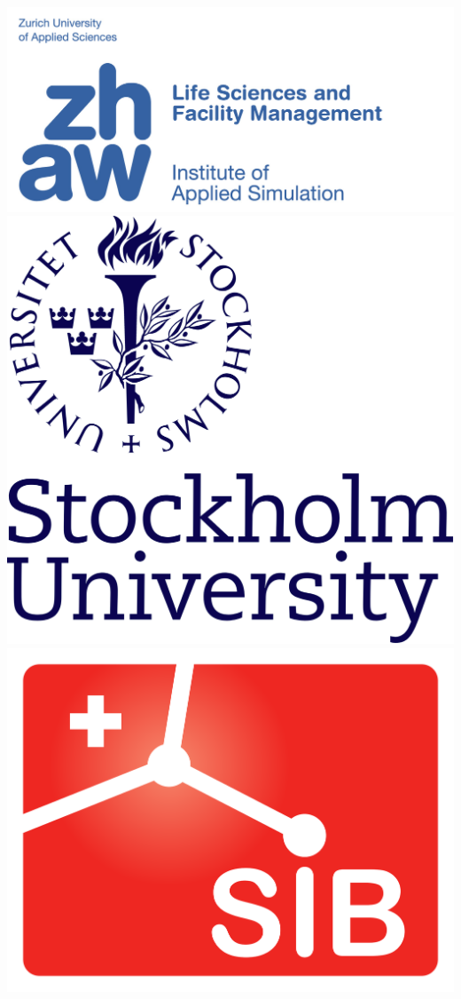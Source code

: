 \documentclass[widescreen,fleqn]{betterposter}
\begin{document}
{{%
\begin{minipage}[t]{\textwidth}
    \begin{center}
    \includegraphics[width=0.105\paperwidth]{img/zhaw_lsfm_ias_blau_en.jpg}
    \includegraphics[width=0.05\paperwidth]{img/logo_SU.png}
    \includegraphics[width=0.063\paperwidth]{img/logo_sib.png}    
    \end{center}
\end{minipage}

}}
\end{document}
